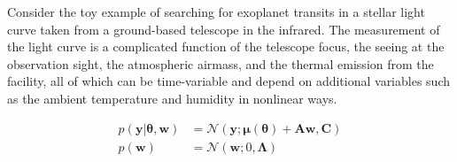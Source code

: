 \documentclass[modern]{rnaastex}
\newcommand{\bvec}[1]{{\ensuremath{\boldsymbol{#1}}}}
\begin{document}
Consider the toy example of searching for exoplanet transits in a stellar 
light curve taken from a ground-based telescope in the infrared. 
The measurement of the light curve is a complicated function of the telescope 
focus, the seeing at the observation sight, the atmospheric airmass, and the 
thermal emission from the facility, all of which can be time-variable and 
depend on additional variables such as the ambient temperature and humidity 
in nonlinear ways.

\begin{align}
p(\bvec{y} | \bvec{\theta}, \bvec{w}) &= 
    \mathcal{N}(\bvec{y}; 
                \bvec{\mu}(\bvec{\theta}) + \bvec{A}\bvec{w}, 
                \bvec{C}) 
                \nonumber\\
%
p(\bvec{w}) &= \mathcal{N}(\bvec{w}; 0, \bvec{\Lambda}) \nonumber
\end{align}
\end{document}
